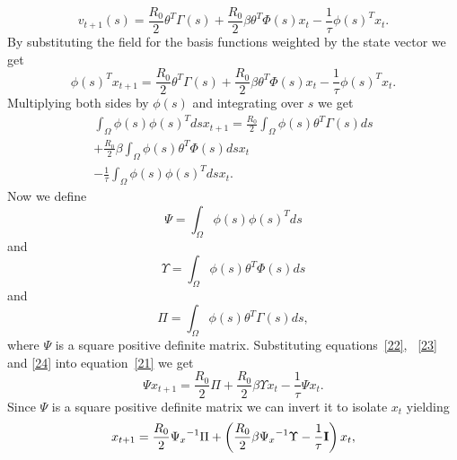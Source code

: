 \documentclass[onecolumn,draftcls]{IEEEtran}
\begin{document}
\begin{equation}\label{Eq19}
{v_{t + 1}}\left( s \right) = \frac{{{R_0}}}{2}{\theta ^T}\Gamma \left( s \right) + \frac{{{R_0}}}{2}\beta {\theta ^T}\Phi \left( s \right){x_t} - \frac{1}{\tau }\phi {\left( s \right)^T}{x_t}.
\end{equation}
By substituting the field for the basis functions weighted by the state vector we get
\begin{equation}\label{Eq20}
\phi {\left( s \right)^T}{x_{t + 1}} = \frac{{{R_0}}}{2}{\theta ^T}\Gamma \left( s \right) + \frac{{{R_0}}}{2}\beta {\theta ^T}\Phi \left( s \right){x_t} - \frac{1}{\tau }\phi {\left( s \right)^T}{x_t}.
\end{equation}
Multiplying both sides by $\phi(s)$ and integrating over $s$ we get
\begin{align}\label{21}
 \int_\Omega  {\phi \left( s \right)\phi {{\left( s \right)}^T}ds{x_{t + 1}}}  = \frac{{{R_0}}}{2}\int_\Omega  {\phi \left( s \right){\theta ^T}\Gamma \left( s \right)ds}  \nonumber \\
  + \frac{{{R_0}}}{2}\beta \int_\Omega  {\phi \left( s \right){\theta ^T}\Phi \left( s \right)ds} {x_t} \\
  - \frac{1}{\tau }\int_\Omega  {\phi \left( s \right)\phi {{\left( s \right)}^T}ds} {x_t}. \nonumber
\end{align}
Now we define
\begin{equation}\label{22}
\Psi  = \int_\Omega  {\phi \left( s \right)\phi {{\left( s \right)}^T}ds}
\end{equation}
and
\begin{equation}\label{23}
\Upsilon  = \int_\Omega  {\phi \left( s \right){\theta ^T}\Phi \left( s \right)ds}
\end{equation}
and
\begin{equation}\label{24}
\Pi  = \int_\Omega  {\phi \left( s \right){\theta ^T}\Gamma \left( s \right)ds},
\end{equation}
where $\Psi$ is a square positive definite matrix. Substituting equations~\ref{22}, ~\ref{23} and \ref{24} into equation~\ref{21} we get
\begin{equation}\label{25}
\Psi {x_{t + 1}} = \frac{{{R_0}}}{2}\Pi  + \frac{{{R_0}}}{2}\beta \Upsilon {x_t} - \frac{1}{\tau }\Psi {x_t}.
\end{equation}
Since $\Psi$ is a square positive definite matrix we can invert it to isolate $x_t$ yielding
\begin{equation}\label{26}
{x_{t + 1}} = \frac{{{R_0}}}{2}{\Psi _x}^{ - 1}\Pi  + \left( {\frac{{{R_0}}}{2}\beta {\Psi _x}^{ - 1}\Upsilon  - \frac{1}{\tau }{\bf{I}}} \right){x_t},
\end{equation}
\end{document}
